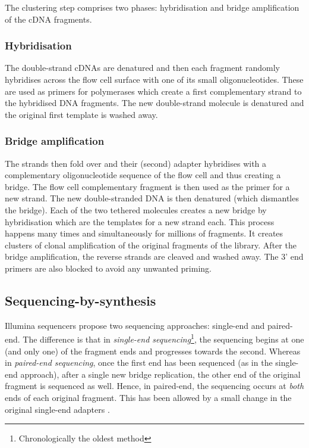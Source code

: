 The clustering step comprises two phases: hybridisation and bridge amplification
of the \gls{cDNA} fragments.

\subsubsection{Hybridisation}

The double-strand \glspl{cDNA} are denatured and then each fragment randomly
hybridises across the flow cell surface with one of its small oligonucleotides.
These are used as primers for polymerases which create a first complementary
strand to the hybridised \gls{DNA} fragments. The new double-strand molecule is
denatured and the original first template is washed away.

\subsubsection{Bridge amplification}
The strands then fold over and their (second) adapter hybridises with a
complementary oligonucleotide sequence of the flow cell and thus creating a
bridge. The flow cell complementary fragment is then used as the primer for a new
strand. The new double-stranded \gls{DNA} is then denatured (which
dismantles the bridge). Each of the two tethered molecules creates a new
bridge by hybridisation which are the templates for a new strand each.
This process happens many times and simultaneously for millions of fragments.
It creates clusters of clonal amplification of the original fragments of
the library. After the bridge amplification, the reverse strands are cleaved
and washed away. The 3' end primers are also blocked to avoid any unwanted
priming.

\subsection{Sequencing-by-synthesis}
\label{subsub:sequencing}

Illumina sequencers propose two sequencing approaches: single-end and paired-end.
The difference is that in \emph{single-end sequencing}\footnote{Chronologically
the oldest method}, the sequencing begins at one (and only one) of the fragment
ends and progresses towards the second. Whereas in \emph{paired-end sequencing},
once the first end has been sequenced (as in the single-end approach), after a
single new bridge replication, the other end of the original fragment is
sequenced as well. Hence, in paired-end, the sequencing occurs at \emph{both}
ends of each original fragment. This has been allowed by a small change in
the original single-end adapters .

